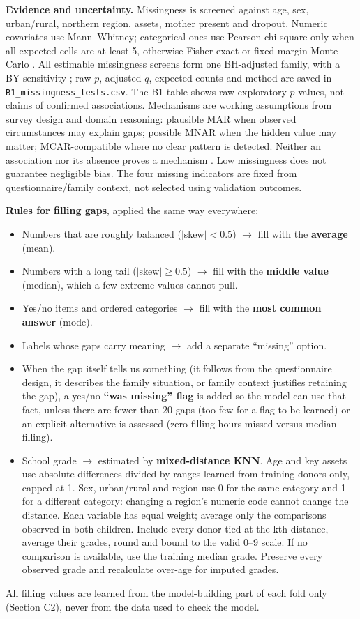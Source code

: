 \documentclass[conference,a4paper]{IEEEtran}
\newcommand{\var}[1]{\texttt{#1}}
\begin{document}
\textbf{Evidence and uncertainty.} Missingness is screened against age, sex, urban/rural, northern region, assets, mother present and dropout. Numeric covariates use Mann--Whitney; categorical ones use Pearson chi-square only when all expected cells are at least 5, otherwise Fisher exact or fixed-margin Monte Carlo \cite{scipyfisher}. All estimable missingness screens form one BH-adjusted family, with a BY sensitivity \cite{scipyfdr}; raw $p$, adjusted $q$, expected counts and method are saved in \var{B1\_missingness\_tests.csv}. The B1 table shows raw exploratory $p$ values, not claims of confirmed associations. Mechanisms are working assumptions from survey design and domain reasoning: plausible MAR when observed circumstances may explain gaps; possible MNAR when the hidden value may matter; MCAR-compatible where no clear pattern is detected. Neither an association nor its absence proves a mechanism \cite{rubin1976,littlerubin}. Low missingness does not guarantee negligible bias. The four missing indicators are fixed from questionnaire/family context, not selected using validation outcomes.

\textbf{Rules for filling gaps}, applied the same way everywhere:
\begin{itemize}
\item Numbers that are roughly balanced ($|$skew$|<0.5$) $\rightarrow$ fill with the \textbf{average} (mean).
\item Numbers with a long tail ($|$skew$|\ge0.5$) $\rightarrow$ fill with the \textbf{middle value} (median), which a few extreme values cannot pull.
\item Yes/no items and ordered categories $\rightarrow$ fill with the \textbf{most common answer} (mode).
\item Labels whose gaps carry meaning $\rightarrow$ add a separate ``missing'' option.
\item When the gap itself tells us something (it follows from the questionnaire design, it describes the family situation, or family context justifies retaining the gap), a yes/no \textbf{``was missing'' flag} is added so the model can use that fact, unless there are fewer than 20 gaps (too few for a flag to be learned) or an explicit alternative is assessed (zero-filling hours missed versus median filling).
\item School grade $\rightarrow$ estimated by \textbf{mixed-distance KNN}. Age and key assets use absolute differences divided by ranges learned from training donors only, capped at 1. Sex, urban/rural and region use 0 for the same category and 1 for a different category: changing a region's numeric code cannot change the distance. Each variable has equal weight; average only the comparisons observed in both children. Include every donor tied at the kth distance, average their grades, round and bound to the valid 0--9 scale. If no comparison is available, use the training median grade. Preserve every observed grade and recalculate over-age for imputed grades.
\end{itemize}
All filling values are learned from the model-building part of each fold only (Section C2), never from the data used to check the model.
\end{document}

